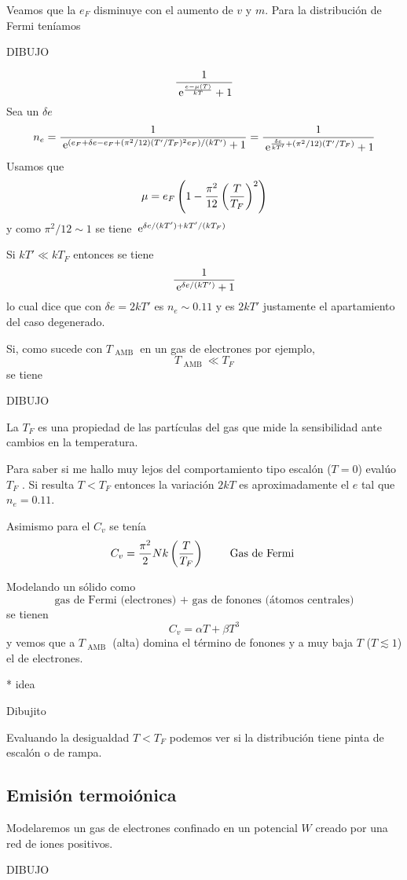 \documentclass[10pt,oneside]{CBFT_book}
\begin{document}
Veamos que la $e_F$ disminuye con el aumento de $v$ y $m$. Para la distribución de
Fermi teníamos

DIBUJO 

\[
	\frac{1}{\:\mathrm{e}^{\frac{e-\mu(T)}{kT}} + 1 }
\]
Sea un $\delta e$
\[
	n_e = \frac{1}{ \:\mathrm{e}^{ (e_F +\delta e - e_F + (\pi^2/12)(T'/T_F)^2 e_F )/(kT')} + 1} =
	\frac{1}{ \:\mathrm{e}^{ \frac{\delta e}{kT'} + (\pi^2/12)(T'/T_F) } + 1}
\]
Usamos que 
\[
	\mu = e_F \left( 1 - \frac{\pi^2}{12}\left( \frac{ T }{ T_F } \right)^2 \right)
\]
y como $\pi^2/12 \sim 1$ se tiene $\:\mathrm{e}^{ \delta e/(kT') + kT'/(kT_F)}$

Si $ kT' \ll kT_F $ entonces se tiene 
\[
	\frac{1}{\:\mathrm{e}^{\delta e/(kT')} + 1}
\]
lo cual dice que con $ \delta e = 2kT'$ es $ n_e \sim 0.11 $ y es $ 2kT' $ justamente el apartamiento del 
caso degenerado.

Si, como sucede con $T_{\text{ AMB }}$ en un gas de electrones por ejemplo,
\[
	T_{\text{ AMB }} \ll T_F
\]
se tiene 

DIBUJO

La $T_F$ es una propiedad de las partículas del gas que mide la sensibilidad ante cambios en la
temperatura.

Para saber si me hallo muy lejos del comportamiento tipo escalón ($T=0$) evalúo $T_F$ . Si resulta 
$T < T_F $ entonces la variación $2kT$ es aproximadamente el $e$ tal que $n_e = 0.11$.

Asimismo para el $C_v$ se tenía 
\[
	C_v = \frac{\pi^2}{2} Nk \left( \frac{ T }{ T_F } \right) \qquad \text{ Gas de Fermi }
\]

Modelando un sólido como 
\[
	\text{ gas de Fermi (electrones) } + \text{ gas de fonones (átomos centrales) }
\]
se tienen 
\[
	C_v = \alpha T + \beta T^3
\]
y vemos que a $T_{\text{ AMB }}$ (alta) domina el término de fonones y a muy baja $T$ ($T \lesssim 1 $)
el de electrones.

* idea

Dibujito 

Evaluando la desigualdad $T<T_F$ podemos ver si la distribución tiene pinta de escalón o de rampa.

\subsection{Emisión termoiónica}

Modelaremos un gas de electrones confinado en un potencial $W$ creado por una red de iones positivos.

DIBUJO
\end{document}

